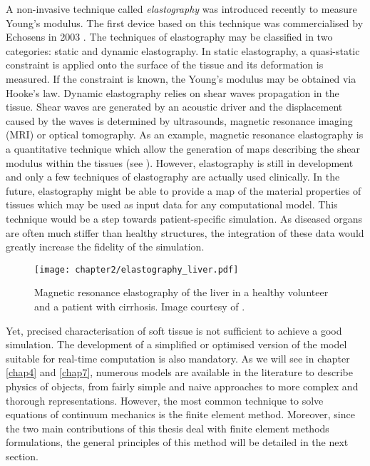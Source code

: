 A non-invasive technique called \emph{elastography} was introduced recently to measure Young's modulus. The first device based on this technique was commercialised by Echosens in 2003 \citep{Bastard09}. The techniques of elastography may be classified in two categories: static and dynamic elastography. In static elastography, a quasi-static constraint is applied onto the surface of the tissue and its deformation is measured. If the constraint is known, the Young's modulus may be obtained via Hooke's law. Dynamic elastography relies on shear waves propagation in the tissue. Shear waves are generated by an acoustic driver and the displacement caused by the waves is determined by ultrasounds, magnetic resonance imaging (MRI) or optical tomography. As an example, magnetic resonance elastography is a quantitative technique which allow the generation of maps describing the shear modulus within the tissues (see ). However, elastography is still in development and only a few techniques of elastography are actually used clinically. In the future, elastography might be able to provide a map of the material properties of tissues which may be used as input data for any computational model. This technique would be a step towards patient-specific simulation. As diseased organs are often much stiffer than healthy structures, the integration of these data would greatly increase the fidelity of the simulation.
%
\begin{figure}[ht]
\centering
\texttt{[image: chapter2/elastography\_liver.pdf]}
\caption {\ON Magnetic resonance elastography of the liver in a healthy volunteer and a patient with cirrhosis. Image courtesy of \cite{Talwalkar07}.}
\label{chap2:fig-elastography_liver}
\end{figure}

Yet, precised characterisation of soft tissue is not sufficient to achieve a good simulation. The development of a simplified or optimised version of the model suitable for real-time computation is also mandatory. \OFF As we will see in chapter \ref{chap4} and \ref{chap7}, numerous models are available in the literature to describe physics of objects, from fairly simple and naive approaches to more complex and thorough representations. However, the most common technique to solve equations of continuum mechanics is the finite element method. Moreover, since the two main contributions of this thesis deal with finite element methods formulations, the general principles of this method will be detailed in the next section. 
